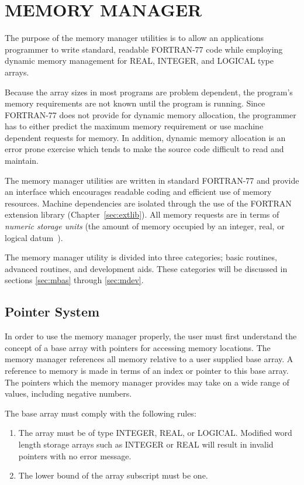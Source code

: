 \chapter{MEMORY MANAGER}
The purpose of the memory manager utilities is to allow an applications
programmer to write standard, readable FORTRAN-77 code while employing
dynamic memory management for REAL, INTEGER, and LOGICAL type arrays.

Because the array sizes in most programs are problem dependent, the
program's memory requirements are not known until the program is running.
Since FORTRAN-77 does not provide for dynamic memory allocation, the
programmer has to either predict the maximum memory requirement or use
machine dependent requests for memory.  In addition, dynamic memory
allocation is an error prone exercise which tends to make the source code
difficult to read and maintain.

The memory manager utilities are written in standard FORTRAN-77 and provide
an interface which encourages readable coding and efficient use of memory
resources.  Machine dependencies are isolated through the use of the FORTRAN
extension library (Chapter~\ref{sec:extlib}). All memory requests are in
terms of {\em numeric storage units} (the amount of memory occupied by an
integer, real, or logical datum~\cite{ansi}).

The memory manager utility is divided into three categories; basic routines,
advanced routines, and development aids.  These categories will be discussed
in sections \ref{sec:mbas} through \ref{sec:mdev}.


\section{Pointer System}
In order to use the memory manager properly, the user must first understand
the concept of a base array with pointers for accessing memory locations.
The memory manager references all memory relative to a user supplied base
array.  A reference to memory is made in terms of an index or pointer to
this base array.  The pointers which the memory manager provides may take on
a wide range of values, including negative numbers.

The base array must comply with the following rules:
\begin{enumerate}
\item The array must be of type INTEGER, REAL, or LOGICAL.  Modified word
length storage arrays such as INTEGER or REAL will result in
invalid pointers with no error message.

\item The lower bound of the array subscript must be one.
\end{enumerate}


